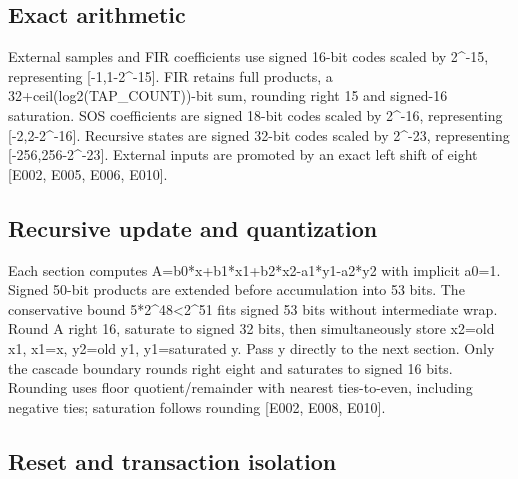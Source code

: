 \documentclass[11pt,a4paper]{article}
\begin{document}
\subsection{Exact arithmetic}

External samples and FIR coefficients use signed 16-bit codes scaled by 2\textasciicircum{}-15,\allowbreak{} representing [\allowbreak{}-1,\allowbreak{}1-2\textasciicircum{}-15]\allowbreak{}. FIR retains full products,\allowbreak{} a 32+\allowbreak{}ceil(\allowbreak{}log2(\allowbreak{}TAP\_\allowbreak{}COUNT)\allowbreak{})\allowbreak{}-bit sum,\allowbreak{} rounding right 15 and signed-16 saturation. SOS coefficients are signed 18-bit codes scaled by 2\textasciicircum{}-16,\allowbreak{} representing [\allowbreak{}-2,\allowbreak{}2-2\textasciicircum{}-16]\allowbreak{}. Recursive states are signed 32-bit codes scaled by 2\textasciicircum{}-23,\allowbreak{} representing [\allowbreak{}-256,\allowbreak{}256-2\textasciicircum{}-23]\allowbreak{}. External inputs are promoted by an exact left shift of eight [\allowbreak{}E002,\allowbreak{} E005,\allowbreak{} E006,\allowbreak{} E010]\allowbreak{}.

\subsection{Recursive update and quantization}

Each section computes A=\allowbreak{}b0*\allowbreak{}x+\allowbreak{}b1*\allowbreak{}x1+\allowbreak{}b2*\allowbreak{}x2-a1*\allowbreak{}y1-a2*\allowbreak{}y2 with implicit a0=\allowbreak{}1. Signed 50-bit products are extended before accumulation into 53 bits. The conservative bound 5*\allowbreak{}2\textasciicircum{}48<2\textasciicircum{}51 fits signed 53 bits without intermediate wrap. Round A right 16,\allowbreak{} saturate to signed 32 bits,\allowbreak{} then simultaneously store x2=\allowbreak{}old x1,\allowbreak{} x1=\allowbreak{}x,\allowbreak{} y2=\allowbreak{}old y1,\allowbreak{} y1=\allowbreak{}saturated y. Pass y directly to the next section. Only the cascade boundary rounds right eight and saturates to signed 16 bits. Rounding uses floor quotient/\allowbreak{}remainder with nearest ties-to-even,\allowbreak{} including negative ties; saturation follows rounding [\allowbreak{}E002,\allowbreak{} E008,\allowbreak{} E010]\allowbreak{}.

\subsection{Reset and transaction isolation}
\end{document}
